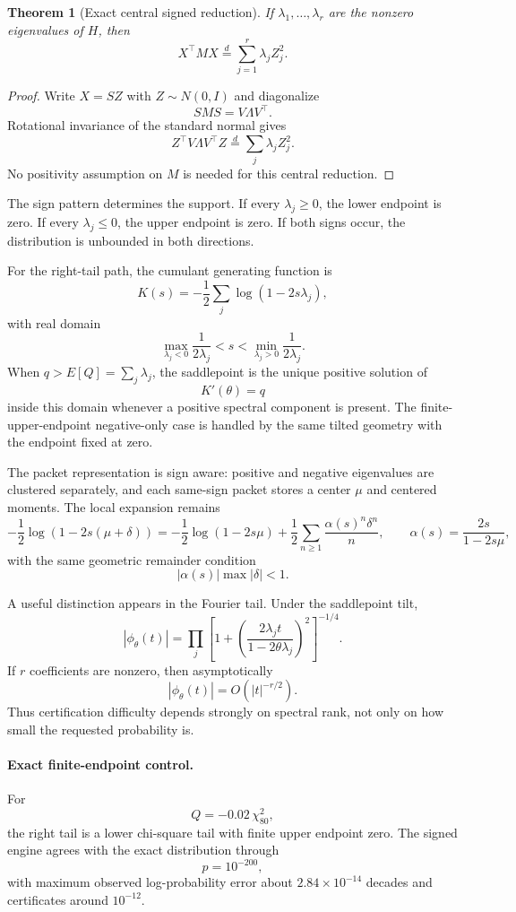 \documentclass[11pt]{article}
\newtheorem{theorem}{Theorem}[section]
\theoremstyle{definition}
\theoremstyle{remark}
\begin{document}
\begin{theorem}[Exact central signed reduction]
If $\lambda_1,\ldots,\lambda_r$ are the nonzero eigenvalues of $H$, then
\[
\boxed{
X^\top M X
\overset d=
\sum_{j=1}^r\lambda_jZ_j^2.
}
\]
\end{theorem}

\begin{proof}
Write $X=SZ$ with $Z\sim N(0,I)$ and diagonalize
\[
SMS=V\Lambda V^\top.
\]
Rotational invariance of the standard normal gives
\[
Z^\top V\Lambda V^\top Z
\overset d=
\sum_j\lambda_jZ_j^2.
\]
No positivity assumption on $M$ is needed for this central reduction.
\end{proof}

The sign pattern determines the support.  If every $\lambda_j\ge0$, the lower
endpoint is zero.  If every $\lambda_j\le0$, the upper endpoint is zero.  If
both signs occur, the distribution is unbounded in both directions.

For the right-tail path, the cumulant generating function is
\[
K(s)
=
-\frac12\sum_j\log(1-2s\lambda_j),
\]
with real domain
\[
\boxed{
\max_{\lambda_j<0}\frac{1}{2\lambda_j}
< s <
\min_{\lambda_j>0}\frac{1}{2\lambda_j}.
}
\]
When $q>E[Q]=\sum_j\lambda_j$, the saddlepoint is the unique positive solution
of
\[
K'(\theta)=q
\]
inside this domain whenever a positive spectral component is present.  The
finite-upper-endpoint negative-only case is handled by the same tilted
geometry with the endpoint fixed at zero.

The packet representation is sign aware: positive and negative eigenvalues are
clustered separately, and each same-sign packet stores a center $\mu$ and
centered moments.  The local expansion remains
\[
-\frac12\log(1-2s(\mu+\delta))
=
-\frac12\log(1-2s\mu)
+
\frac12\sum_{n\ge1}
\frac{\alpha(s)^n\delta^n}{n},
\qquad
\alpha(s)=\frac{2s}{1-2s\mu},
\]
with the same geometric remainder condition
\[
|\alpha(s)|\max|\delta|<1.
\]

A useful distinction appears in the Fourier tail.  Under the saddlepoint tilt,
\[
\left|\phi_\theta(t)\right|
=
\prod_j
\left[
1+
\left(
\frac{2\lambda_j t}{1-2\theta\lambda_j}
\right)^2
\right]^{-1/4}.
\]
If $r$ coefficients are nonzero, then asymptotically
\[
|\phi_\theta(t)|=O(|t|^{-r/2}).
\]
Thus certification difficulty depends strongly on spectral rank, not only on
how small the requested probability is.

\paragraph{Exact finite-endpoint control.}
For
\[
Q=-0.02\,\chi^2_{80},
\]
the right tail is a lower chi-square tail with finite upper endpoint zero.  The
signed engine agrees with the exact distribution through
\[
\boxed{p=10^{-200}},
\]
with maximum observed log-probability error about $2.84\times10^{-14}$ decades
and certificates around $10^{-12}$.
\end{document}
